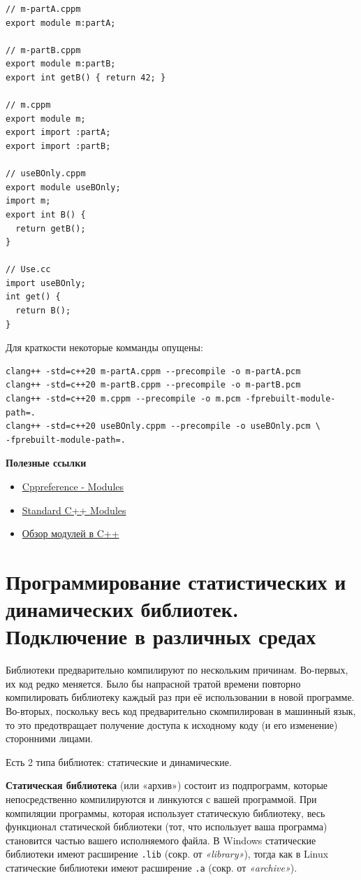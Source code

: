 \begin{verbatim}
// m-partA.cppm
export module m:partA;

// m-partB.cppm
export module m:partB;
export int getB() { return 42; }

// m.cppm
export module m;
export import :partA;
export import :partB;

// useBOnly.cppm
export module useBOnly;
import m;
export int B() {
  return getB();
}

// Use.cc
import useBOnly;
int get() {
  return B();
}
\end{verbatim}

Для краткости некоторые комманды опущены:
\begin{verbatim}
clang++ -std=c++20 m-partA.cppm --precompile -o m-partA.pcm
clang++ -std=c++20 m-partB.cppm --precompile -o m-partB.pcm
clang++ -std=c++20 m.cppm --precompile -o m.pcm -fprebuilt-module-path=.
clang++ -std=c++20 useBOnly.cppm --precompile -o useBOnly.pcm \
-fprebuilt-module-path=.
\end{verbatim}

\textbf{Полезные ссылки}
\begin{itemize}
    \item \href{https://en.cppreference.com/w/cpp/language/modules.html}{Cppreference - Modules}
    \item \href{https://clang.llvm.org/docs/StandardCPlusPlusModules.html}{Standard C++ Modules}
    \item \href{https://learn.microsoft.com/ru-ru/cpp/cpp/modules-cpp?view=msvc-170}{Обзор модулей в C++}
\end{itemize}

\section{Программирование статистических и динамических библиотек.  Подключение в различных средах}

Библиотеки предварительно компилируют по нескольким причинам. Во-первых, их код редко меняется. Было бы напрасной тратой времени повторно компилировать библиотеку каждый раз при её использовании в новой программе. Во-вторых, поскольку весь код предварительно скомпилирован в машинный язык, то это предотвращает получение доступа к исходному коду (и его изменение) сторонними лицами.

Есть 2 типа библиотек: статические и динамические.

\textbf{Статическая библиотека} (или «архив») состоит из подпрограмм, которые непосредственно компилируются и линкуются с вашей программой. При компиляции программы, которая использует статическую библиотеку, весь функционал статической библиотеки (тот, что использует ваша программа) становится частью вашего исполняемого файла. В Windows статические библиотеки имеют расширение \texttt{.lib} (сокр. от \textit{«library»}), тогда как в Linux статические библиотеки имеют расширение \texttt{.a} (сокр. от \textit{«archive»}).

